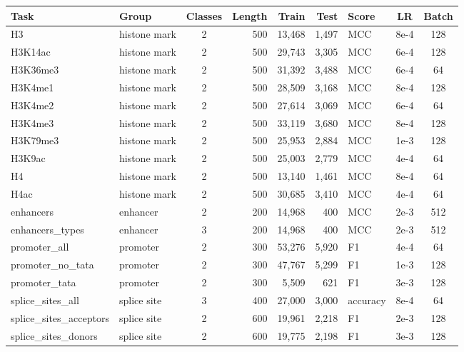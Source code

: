 \begin{tabular}{llcrrrlcc}
\toprule
Task & Group & Classes & Length & Train & Test & Score & LR & Batch \\
\midrule
H3 & histone mark & 2 & 500 & 13,468 & 1,497 & MCC & 8e-4 & 128 \\
H3K14ac & histone mark & 2 & 500 & 29,743 & 3,305 & MCC & 6e-4 & 128 \\
H3K36me3 & histone mark & 2 & 500 & 31,392 & 3,488 & MCC & 6e-4 & 64 \\
H3K4me1 & histone mark & 2 & 500 & 28,509 & 3,168 & MCC & 8e-4 & 128 \\
H3K4me2 & histone mark & 2 & 500 & 27,614 & 3,069 & MCC & 6e-4 & 64 \\
H3K4me3 & histone mark & 2 & 500 & 33,119 & 3,680 & MCC & 8e-4 & 128 \\
H3K79me3 & histone mark & 2 & 500 & 25,953 & 2,884 & MCC & 1e-3 & 128 \\
H3K9ac & histone mark & 2 & 500 & 25,003 & 2,779 & MCC & 4e-4 & 64 \\
H4 & histone mark & 2 & 500 & 13,140 & 1,461 & MCC & 8e-4 & 64 \\
H4ac & histone mark & 2 & 500 & 30,685 & 3,410 & MCC & 4e-4 & 64 \\
enhancers & enhancer & 2 & 200 & 14,968 & 400 & MCC & 2e-3 & 512 \\
enhancers\_types & enhancer & 3 & 200 & 14,968 & 400 & MCC & 2e-3 & 512 \\
promoter\_all & promoter & 2 & 300 & 53,276 & 5,920 & F1 & 4e-4 & 64 \\
promoter\_no\_tata & promoter & 2 & 300 & 47,767 & 5,299 & F1 & 1e-3 & 128 \\
promoter\_tata & promoter & 2 & 300 & 5,509 & 621 & F1 & 3e-3 & 128 \\
splice\_sites\_all & splice site & 3 & 400 & 27,000 & 3,000 & accuracy & 8e-4 & 64 \\
splice\_sites\_acceptors & splice site & 2 & 600 & 19,961 & 2,218 & F1 & 2e-3 & 128 \\
splice\_sites\_donors & splice site & 2 & 600 & 19,775 & 2,198 & F1 & 3e-3 & 128 \\
\bottomrule
\end{tabular}
